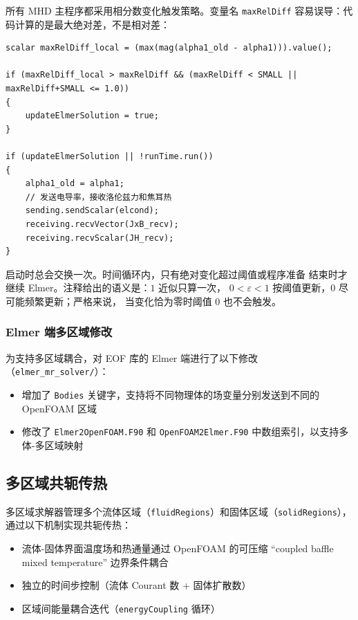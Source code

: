 \documentclass[11pt,a4paper]{article}
\begin{document}
所有 MHD 主程序都采用相分数变化触发策略。变量名
\texttt{maxRelDiff} 容易误导：代码计算的是最大绝对差，不是相对差：

\begin{lstlisting}[style=cppstyle]
scalar maxRelDiff_local = (max(mag(alpha1_old - alpha1))).value();

if (maxRelDiff_local > maxRelDiff && (maxRelDiff < SMALL || maxRelDiff+SMALL <= 1.0))
{
    updateElmerSolution = true;
}

if (updateElmerSolution || !runTime.run())
{
    alpha1_old = alpha1;
    // 发送电导率，接收洛伦兹力和焦耳热
    sending.sendScalar(elcond);
    receiving.recvVector(JxB_recv);
    receiving.recvScalar(JH_recv);
}
\end{lstlisting}

启动时总会交换一次。时间循环内，只有绝对变化超过阈值或程序准备
结束时才继续 Elmer。注释给出的语义是：$1$ 近似只算一次，
$0<\varepsilon<1$ 按阈值更新，$0$ 尽可能频繁更新；严格来说，
当变化恰为零时阈值 0 也不会触发。

\subsubsection{Elmer 端多区域修改}

为支持多区域耦合，对 EOF 库的 Elmer 端进行了以下修改（\texttt{elmer\_mr\_solver/}）：
\begin{itemize}
    \item 增加了 \texttt{Bodies} 关键字，支持将不同物理体的场变量分别发送到不同的 OpenFOAM 区域
    \item 修改了 \texttt{Elmer2OpenFOAM.F90} 和 \texttt{OpenFOAM2Elmer.F90} 中数组索引，以支持多体-多区域映射
\end{itemize}

\subsection{多区域共轭传热}

多区域求解器管理多个流体区域（\texttt{fluidRegions}）和固体区域（\texttt{solidRegions}），通过以下机制实现共轭传热：

\begin{itemize}
    \item 流体-固体界面温度场和热通量通过 OpenFOAM 的可压缩
    ``coupled baffle mixed temperature'' 边界条件耦合
    \item 独立的时间步控制（流体 Courant 数 + 固体扩散数）
    \item 区域间能量耦合迭代（\texttt{energyCoupling} 循环）
\end{itemize}
\end{document}
